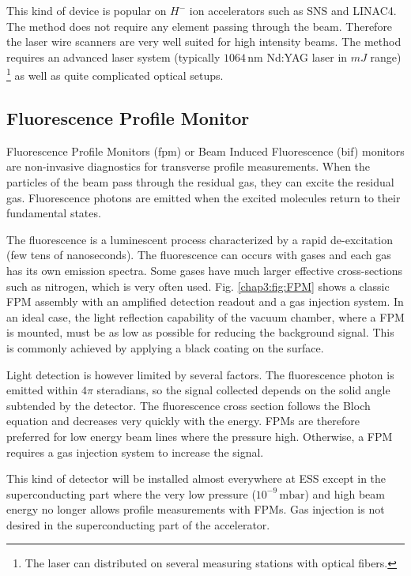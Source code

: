 \begin{refsection}
  This kind of device is popular on $H^-$ ion accelerators such as SNS and LINAC4. The method does not require any element passing through the beam. Therefore the laser wire scanners are very well suited for high intensity beams. The method requires an advanced laser system (typically $1064\,\mathrm{nm}$ Nd:YAG laser in $mJ$ range) \footnote{The laser can distributed on several measuring stations with optical fibers.} as well as quite complicated optical setups.

  \subsection{Fluorescence Profile Monitor}
  Fluorescence Profile Monitors (\acrshort{fpm}) or Beam Induced Fluorescence (\acrshort{bif}) monitors are non-invasive diagnostics for transverse profile measurements. When the particles of the beam pass through the residual gas, they can excite the residual gas. Fluorescence photons are emitted when the excited molecules return to their fundamental states.

  The fluorescence is a luminescent process characterized by a rapid de-excitation (few tens of nanoseconds). The fluorescence can occurs with gases and each gas has its own emission spectra. Some gases have much larger effective cross-sections such as nitrogen, which is very often used. Fig. \ref{chap3:fig:FPM} shows a classic FPM assembly with an amplified detection readout and a gas injection system. In an ideal case, the light reflection capability of the vacuum chamber, where a FPM is mounted, must be as low as possible for reducing the background signal. This is commonly achieved by applying a black coating on the surface.

  
  Light detection is however limited by several factors. The fluorescence photon is emitted within $4\pi$ steradians, so the signal collected depends on the solid angle subtended by the detector. The fluorescence cross section follows the Bloch equation and decreases very quickly with the energy. FPMs are therefore preferred for low energy beam lines where the pressure high. Otherwise, a FPM requires a gas injection system to increase the signal.

  This kind of detector will be installed almost everywhere at ESS \cite{Thomas2016} except in the superconducting part where the very low pressure ($10^{-9}\,\mathrm{mbar}$) and high beam energy no longer allows profile measurements with FPMs. Gas injection is not desired in the superconducting part of the accelerator.


\end{refsection}
